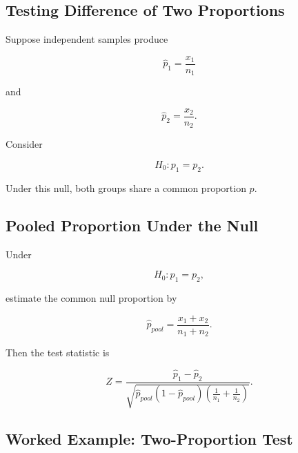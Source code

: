 \subsection{Testing Difference of Two Proportions}
\label{subsec:test-two-proportions}

Suppose independent samples produce

\[
\widehat{p}_1
=
\frac{x_1}{n_1}
\]

and

\[
\widehat{p}_2
=
\frac{x_2}{n_2}.
\]

Consider

\[
\boxed{
H_0:p_1=p_2.
}
\]

Under this null, both groups share a common proportion \(p\).

\subsection{Pooled Proportion Under the Null}
\label{subsec:pooled-proportion-test}

Under

\[
H_0:p_1=p_2,
\]

estimate the common null proportion by

\[
\boxed{
\widehat{p}_{pool}
=
\frac{
x_1+x_2
}{
n_1+n_2
}.
}
\]

Then the test statistic is

\[
\boxed{
Z
=
\frac{
\widehat{p}_1-\widehat{p}_2
}{
\sqrt{
\widehat{p}_{pool}
(1-\widehat{p}_{pool})
\left(
\frac1{n_1}
+
\frac1{n_2}
\right)
}
}.
}
\]

\subsection{Worked Example: Two-Proportion Test}
\label{subsec:worked-two-proportion-test}

